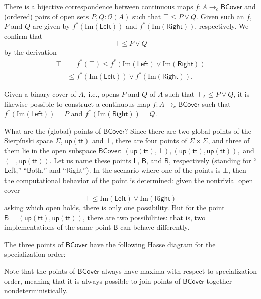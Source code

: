 \documentclass[conference]{IEEEtran}
\newcommand{\cto}{\to_c}
\newcommand{\Open}[1]{\mathcal{O}({#1})}
\newcommand{\Img}[1]{\text{Im}\left({#1}\right)}
\newcommand{\strue}{\mathsf{up}(\mathsf{tt})}
\newcommand{\sfalse}{\bot}
\newcommand{\BCover}{\mathsf{BCover}}
\newcommand{\iimg}[1]{{#1}^*}
\begin{document}
There is a bijective correspondence between continuous maps $f : A \cto \BCover$ and (ordered) pairs of open sets $P, Q : \Open{A}$ such that $\top \le P \vee Q$. Given such an $f$, $P$ and $Q$ are given by $\iimg{f}(\Img{\mathsf{Left}})$ and $\iimg{f}(\Img{\mathsf{Right}})$, respectively. We confirm that
\[
\top \le P \vee Q
\]
by the derivation
\begin{align*}
\top &= \iimg{f}(\top) 
  \le \iimg{f}(\Img{\mathsf{Left}} \vee \Img{\mathsf{Right}})
 \\ &\le \iimg{f}(\Img{\mathsf{Left}}) \vee \iimg{f}(\Img{\mathsf{Right}}).
\end{align*}

Given a binary cover of $A$, i.e., opens $P$ and $Q$ of $A$ such that $\top_A \le P \vee Q$, it is likewise possible to construct a continuous map $f: A \cto \BCover$ such that $\iimg{f}(\Img{\mathsf{Left}}) = P$ and $\iimg{f}(\Img{\mathsf{Right}}) = Q$.

What are the (global) points of $\BCover$? Since there are two global points of the Sierp\'inski space $\Sigma$, $\strue$ and $\sfalse$, there are four points of $\Sigma \times \Sigma$, and three of them lie in the open subspace $\BCover$: $(\strue, \sfalse), (\strue, \strue),$ and $(\sfalse, \strue)$. Let us name these points $\mathsf{L}$, $\mathsf{B}$, and $\mathsf{R}$, respectively (standing for ``$\mathsf{L}$eft,'' ``$\mathsf{B}$oth,'' and ``$\mathsf{R}$ight''). In the scenario where one of the points is $\sfalse$, then the computational behavior of the point is determined: given the nontrivial open cover 
\[
\top \le \Img{\mathsf{Left}} \vee \Img{\mathsf{Right}}
\]
asking which open holds, there is only one possibility. But for the point $\mathsf{B} = (\strue, \strue)$, there are two possibilities: that is, two implementations of the same point $\mathsf{B}$ can behave differently.

The three points of $\BCover$ have the following Hasse diagram for the specialization order:
\begin{center}
\end{center}
Note that the points of $\BCover$ always have maxima with respect to specialization order, meaning that it is always possible to join points of $\BCover$ together nondeterministically.
\end{document}
